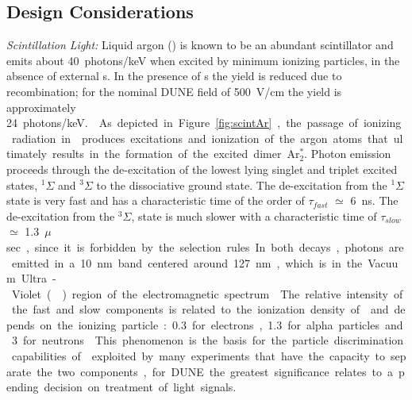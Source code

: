 \subsection{Design Considerations}
\label{sec:fdsp-pd-des-consid}

\emph{Scintillation Light:} Liquid argon (\lar) is known to be an abundant scintillator and emits about \SI{40}{photons/keV} when excited  by minimum ionizing particles\cite{Doke:1990rza},
in the absence of external \efield{}s. In the presence of \efield{}s the yield is reduced due to recombination; for the nominal DUNE  field of \SI{500}{V/cm} the yield is approximately \SI{24}{photons/keV.}~\cite{PhysRevB.20.3486}. 

As depicted in Figure~\ref{fig:scintAr}, the passage of ionizing radiation in \lar produces excitations and ionization of the argon atoms that ultimately results in the formation of the excited dimer Ar$^*_2$.  
Photon emission proceeds through the de-excitation of the lowest lying singlet and triplet excited states, $^{1}\Sigma$ and 
$^{3}\Sigma$ to the dissociative ground state. The de-excitation from the $^{1}\Sigma$ state is very fast and has a characteristic time of the order of 
$\tau_{fast}$ $\simeq$ \SI{6}{ns}. The de-excitation from the $^{3}\Sigma$, state is much slower with a characteristic time of $\tau_{slow}$ $\simeq$ \SI{1.3}{$\mu$sec}, since it is forbidden by the selection rules. 
In both decays, photons are emitted in a \SI{10}{nm} band centered around \SI{127}{nm}, which is in the Vacuum Ultra-Violet () region of the electromagnetic spectrum~\cite{Heindl:2010zz}.
The relative intensity of the  fast and slow components is related to the ionization density of \lar and depends on the ionizing particle: \num{0.3} for electrons, \num{1.3} for alpha particles and \num{3} for neutrons~\cite{PhysRevB.27.5279}.
This phenomenon is the basis for the  particle discrimination capabilities of \lar exploited by many experiments that have the capacity to separate the two components, for DUNE the greatest significance relates to a pending decision on treatment of light signals.

